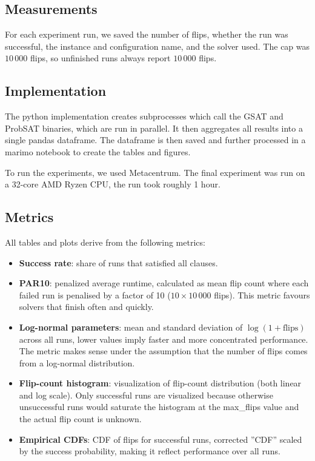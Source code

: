\documentclass[11pt]{article}
\begin{document}
\subsection{Measurements}
For each experiment run, we saved the number of flips,
whether the run was successful, the instance and configuration name,
and the solver used. The cap was $10\,000$ flips, so unfinished runs always
report $10\,000$ flips.

\subsection{Implementation}
The python implementation creates subprocesses which call the GSAT and ProbSAT binaries, which are run in parallel.
It then aggregates all results into a single pandas dataframe.
The dataframe is then saved and further processed in a marimo notebook to create the tables and figures.

To run the experiments, we used Metacentrum. The final experiment was run on a 32-core AMD Ryzen CPU, the run took roughly 1 hour.

\subsection{Metrics}
All tables and plots derive from the following metrics:
\begin{itemize}
  \item \textbf{Success rate}: share of runs that satisfied all clauses.
  \item \textbf{PAR10}: penalized average runtime, calculated as mean flip count where each failed run is penalised by a factor of 10 ($10\times10\,000$ flips). This metric favours solvers that finish often and quickly.
  \item \textbf{Log-normal parameters}: mean and standard deviation of $\log(1+\text{flips})$ across all runs, lower values imply faster and more concentrated performance. The metric makes sense under the assumption that the number of flips comes from a log-normal distribution.
  \item \textbf{Flip-count histogram}: visualization of flip-count distribution (both linear and log scale). Only successful runs are visualized because otherwise unsuccessful runs would saturate the histogram at the max\_flips value and the actual flip count is unknown.
  \item \textbf{Empirical CDFs}: CDF of flips for successful runs, corrected ''CDF'' scaled by the success probability, making it reflect performance over all runs.
\end{itemize}
\end{document}
